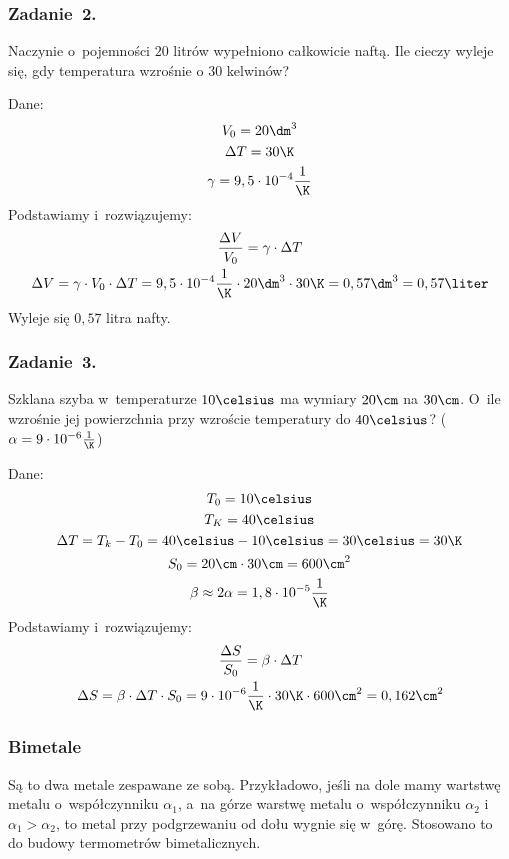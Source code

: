 \subsubsection*{Zadanie~2.}
\begin{statement}
    Naczynie o~pojemności \(20\) litrów wypełniono całkowicie naftą. Ile cieczy wyleje się, gdy temperatura wzrośnie o \(30\) kelwinów?
\end{statement}
Dane:
\begin{gather*}
    V_0 = 20\dm^3\\
    \Delta T = 30\K\\
    \gamma = 9,5 \cdot 10^{-4} \frac{1}{\K}
\end{gather*}
Podstawiamy i~rozwiązujemy:
\begin{gather*}
    \frac{\Delta V}{V_0} = \gamma \cdot \Delta T\\
    \Delta V
        = \gamma \cdot V_0 \cdot \Delta T = 9,5 \cdot 10^{-4}\frac{1}{\K} \cdot 20\dm^3 \cdot 30\K
        = 0,57\dm^3
        = 0,57\liter
\end{gather*}
Wyleje się \(0,57\) litra nafty.
\subsubsection*{Zadanie~3.}
\begin{statement}
    Szklana szyba w~temperaturze \(10\celsius\) ma wymiary \(20\cm\) na \(30\cm\). O~ile wzrośnie jej powierzchnia przy wzroście temperatury do \(40\celsius\)? (\(\alpha = 9 \cdot 10^{-6}\frac{1}{\K}\))
\end{statement}
Dane:
\begin{gather*}
    T_0 = 10\celsius\\
    T_K = 40\celsius\\
    \Delta T = T_k - T_0 = 40\celsius - 10\celsius = 30\celsius = 30\K\\
    S_0 = 20\cm \cdot 30\cm = 600\cm^2\\
    \beta \approx 2\alpha = 1,8 \cdot 10^{-5}\frac{1}{\K}
\end{gather*}
Podstawiamy i~rozwiązujemy:
\begin{gather*}
    \frac{\Delta S}{S_0} = \beta \cdot \Delta T\\
    \Delta S = \beta \cdot \Delta T \cdot S_0
        = 9 \cdot 10^{-6}\frac{1}{\K} \cdot 30\K \cdot 600\cm^2 = 0,162\cm^2
\end{gather*}
\subsubsection*{Bimetale}
Są to dwa metale zespawane ze sobą. Przykładowo, jeśli na dole mamy wartstwę metalu o~współczynniku \(\alpha_1\), a~na górze warstwę metalu o~współczynniku \(\alpha_2\) i~\(\alpha_1 > \alpha_2\), to metal przy podgrzewaniu od dołu wygnie się w~górę. Stosowano to do budowy termometrów bimetalicznych.

